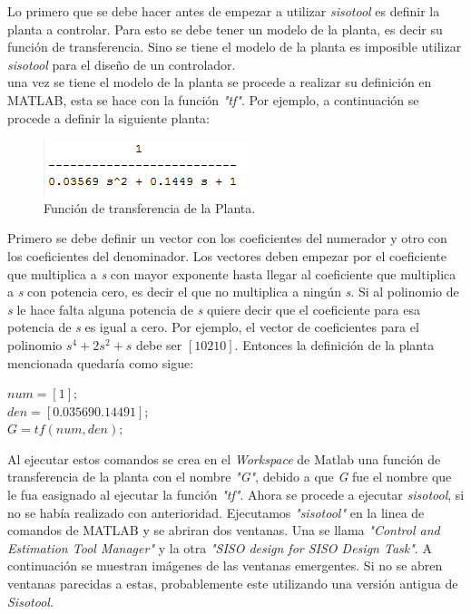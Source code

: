 \documentclass[a4paper,12pt,twoside]{proyectotanquesecci}
\begin{document}
Lo primero que se debe hacer antes de empezar a utilizar \textit{sisotool} es definir la planta a controlar. Para esto se debe tener un modelo de la planta, es decir su función de transferencia. Sino se tiene el modelo de la planta es imposible utilizar \textit{sisotool} para el diseño de un controlador. \\

una vez se tiene el modelo de la planta se procede a realizar su definición en MATLAB, esta se hace con la función \textit{"tf"}. Por ejemplo, a continuación se procede a definir la siguiente planta: \\

\begin{figure}[h]
\centering
\includegraphics[scale=1.0]{FuncionPlanta}
\renewcommand{\figurename}{Fig.}
\caption{Función de transferencia de la Planta.}
\label{Función de transferencia de la Planta.}
\end{figure}

Primero se debe definir un vector con los coeficientes del numerador y otro con los coeficientes del denominador. Los vectores deben empezar por el coeficiente que multiplica a \textit{s} con mayor exponente hasta llegar al coeficiente que multiplica a \textit{s} con potencia cero, es decir el que no multiplica a ningún \textit{s}. Si al polinomio de \textit{s} le hace falta alguna potencia de \textit{s} quiere decir que el coeficiente para esa potencia de \textit{s} es igual a cero. Por ejemplo, el vector de coeficientes para el polinomio $s^{4}+2s^{2}+s$ debe ser $[1 0 2 1 0]$.  Entonces la definición de la planta mencionada quedaría como sigue: \\

\begin{center}
$num=[1];$ \\
$den=[0.03569  0.1449  1];$ \\
$G=tf(num,den);$ \\
\end{center}

Al ejecutar estos comandos se crea en el \textit{Workspace} de Matlab una función de transferencia de la planta con el nombre \textit{"G"}, debido a que \textit{G} fue el nombre que le fua easignado al ejecutar la función \textit{"tf"}. Ahora se procede a ejecutar \textit{sisotool}, si no se había realizado con anterioridad. Ejecutamos \textit{"sisotool"} en la linea de comandos de MATLAB y se abriran dos ventanas. Una se llama \textit{"Control and Estimation Tool Manager"} y la otra \textit{"SISO design for SISO Design Task"}. A continuación se muestran imágenes de las ventanas emergentes. Si no se abren ventanas parecidas a estas, probablemente este utilizando una versión antigua de \textit{Sisotool}. \\
\end{document}
